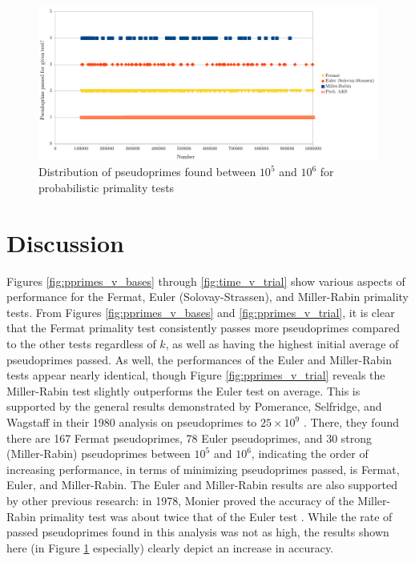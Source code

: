 \documentclass{article}
\begin{document}
\FloatBarrier
\begin{figure}[h!]
\caption{Distribution of pseudoprimes found between $10^5$ and $10^6$ for probabilistic primality tests}
\label{fig:pprimes_passed}
\centering
\includegraphics[width=\textwidth]{pprimes_passed}
\end{figure}
\FloatBarrier

\section{Discussion}
Figures \ref{fig:pprimes_v_bases} through \ref{fig:time_v_trial} show various aspects of performance for the Fermat, Euler (Solovay-Strassen), and Miller-Rabin primality tests. From Figures \ref{fig:pprimes_v_bases} and \ref{fig:pprimes_v_trial}, it is clear that the Fermat primality test consistently passes more pseudoprimes compared to the other tests regardless of $k$, as well as having the highest initial average of pseudoprimes passed. As well, the performances of the Euler and Miller-Rabin tests appear nearly identical, though Figure \ref{fig:pprimes_v_trial} reveals the Miller-Rabin test slightly outperforms the Euler test on average. This is supported by the general results demonstrated by Pomerance, Selfridge, and Wagstaff in their 1980 analysis on pseudoprimes to $25 \times 10^9$ \cite{pomerance_pseudoprimes_1980}. There, they found there are 167 Fermat pseudoprimes, 78 Euler pseudoprimes, and 30 strong (Miller-Rabin) pseudoprimes between $10^5$ and $10^6$, indicating the order of increasing performance, in terms of minimizing pseudoprimes passed, is Fermat, Euler, and Miller-Rabin. The Euler and Miller-Rabin results are also supported by other previous research: in 1978, Monier proved the accuracy of the Miller-Rabin primality test was about twice that of the Euler test \cite{monier_evaluation_1980}. While the rate of passed pseudoprimes found in this analysis was not as high, the results shown here (in Figure \ref{fig:pprimes_passed} especially) clearly depict an increase in accuracy.
\end{document}
